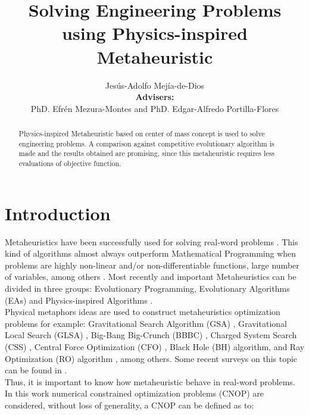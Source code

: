 \documentclass[12pt,letterpape]{article}
\title{Solving Engineering Problems using Physics-inspired Metaheuristic}
\author{Jesús-Adolfo Mejía-de-Dios
\\
{\bf Advisers:}\\
PhD. 
Efrén Mezura-Montes
and
PhD.
Edgar-Alfredo Portilla-Flores
}
\begin{document}
\maketitle

\begin{abstract}
	Physics-inspired Metaheuristic based on center of mass concept is used to solve engineering problems. A comparison against competitive evolutionary algorithm
	is made and the results obtained are promising, since this metaheuristic requires
	less evaluations of objective function.
\end{abstract}

\section{Introduction} %
\label{sec:introduction}

Metaheuristics have been successfully used for solving real-word problems \cite{easSurv}.
This kind of algorithms almost always outperform Mathematical Programming when problems
are highly non-linear and/or non-differentiable functions, large number of variables, 
among others \cite{problemas}. Most recently and important Metaheuristics can be divided in three
groups: Evolutionary Programming, Evolutionary Algorithms (EAs) and Physics-inspired
Algorithms \cite{biswas2013physics, easSurv, DBLP:journals/corr/FisterYFBF13,spall03}.\\

Physical metaphors ideas are used to construct metaheuristics optimization problems
for example: Gravitational  Search Algorithm (GSA) \cite{rashedi2009gsa}, 
Gravitational Local Search (GLSA) \cite{glsa}, Big-Bang Big-Crunch (BBBC) \cite{erol2006new}, 
Charged System Search (CSS) \cite{kaveh2010novel}, Central Force Optimization 
(CFO) \cite{cfo2007}, Black Hole (BH) \cite{hatamlou2013black} algorithm, and Ray 
Optimization (RO) algorithm \cite{kaveh2012new}, among others. Some recent surveys 
on this topic can be found in
\cite{fisicaSurvey,biswas2013physics,DBLP:journals/corr/FisterYFBF13,xie2011convergence}. \\

Thus, it is important to know how metaheuristic behave in real-word problems.
In this work numerical constrained optimization problems (CNOP) are considered,
without loss of generality, a CNOP can be defined as to:\\
\end{document}
